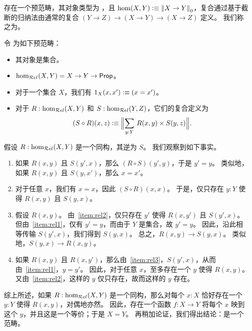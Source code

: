 \begin{eg}\label{ct:hoprecat}
  存在一个预范畴，其对象类型为 \type，且 $\hom(X,Y) \vcentcolon\equiv \mathopen{}\left\Vert X\to Y\right\Vert_{0}\mathclose{}$，复合通过基于截断的归纳法由通常的复合 $(Y\to Z) \to (X\to Y) \to (X\to Z)$ 定义。
  我们称之为。
\end{eg}

\begin{eg}\label{ct:rel}
  令 \urel 为如下预范畴：
  \begin{itemize}
  \item 其对象是集合。
  \item $\hom_{\mathcal{R}el}(X,Y) = X\to Y\to \mathsf{Prop}$。
  \item 对于一个集合 $X$，我们有 $1_X(x,x') \vcentcolon\equiv (x=x')$。
  \item 对于 $R:\hom_{\mathcal{R}el}(X,Y)$ 和 $S:\hom_{\mathcal{R}el}(Y,Z)$，它们的复合定义为
    \[ (S\circ R)(x,z) \defeq \Brck{\sm{y:Y} R(x,y) \times S(y,z)}.\]
  \end{itemize}
  假设 $R:\hom_{\mathcal{R}el}(X,Y)$ 是一个同构，其逆为 $S$。
  我们观察到如下事实。
  \begin{enumerate}
  \item 如果 $R(x,y)$ 且 $S(y',x)$，那么 $(R\circ S)(y',y)$，于是 $y'=y$。
    类似地，如果 $R(x,y)$ 且 $S(y,x')$，那么 $x=x'$。\label{item:rel1}
  \item 对于任意 $x$，我们有 $x=x$，因此 $(S\circ R)(x,x)$。
    于是，仅只存在 $y:Y$ 使得 $R(x,y)$ 且 $S(y,x)$。\label{item:rel2}
  \item 假设 $R(x,y)$。
    由~\ref{item:rel2}，仅只存在 $y'$ 使得 $R(x,y')$ 且 $S(y',x)$。
    但由~\ref{item:rel1}，仅有 $y'=y$，而由于 $Y$ 是集合，故 $y'=y$。
    因此，沿此相等传输 $S(y',x)$，我们得到 $S(y,x)$。
    总之，$R(x,y)\to S(y,x)$。
    类似地，$S(y,x) \to R(x,y)$。\label{item:rel3}
  \item 如果 $R(x,y)$ 且 $R(x,y')$，那么由~\ref{item:rel3}，$S(y',x)$，从而由~\ref{item:rel1}，$y=y'$。
    因此，对于任意 $x$，至多存在一个 $y$ 使得 $R(x,y)$。
    又由~\ref{item:rel2}，这样的 $y$ 仅只存在，故而这样的 $y$ 存在。
  \end{enumerate}
  综上所述，如果 $R:\hom_{\mathcal{R}el}(X,Y)$ 是一个同构，那么对每个 $x:X$ 恰好存在一个 $y:Y$ 使得 $R(x,y)$，对偶地亦然。
  因此，存在一个函数 $f:X\to Y$ 将每个 $x$ 映到这个 $y$，并且这是一个等价；于是 $X=Y$。
  再稍加论证，我们得出结论：\urel 是一个范畴。
\end{eg}

